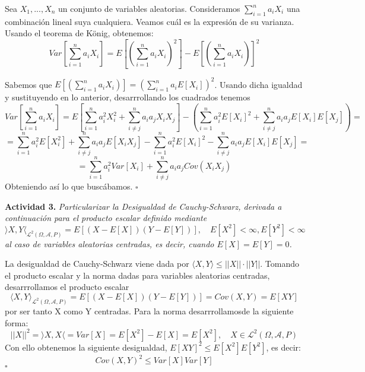 \documentclass[a4paper, 12pt]{article}
\newcommand*{\qed}{\hfill\ensuremath{\square}}
\begin{document}
    Sea $X_1, . . . , X_n$ un conjunto de variables aleatorias. Consideramos $\sum _{i=1}^n a_i X_i$ una combinación lineal suya cualquiera.
    Veamos cuál es la expresión de su varianza. Usando el teorema de König, obtenemos:
    $$Var\left[\sum  _{i=1}^n a_i X_i \right]=E\left[\left(\sum  _{i=1}^n a_i X_i \right)^2\right]-E\left[\left(\sum  _{i=1}^n a_i X_i \right)\right]^2$$
   
    Sabemos que $E\left[\left(\sum  _{i=1}^n a_i X_i \right)\right]=\left(\sum _{i=1}^n a_i E[X_i]\right)^2$. Usando dicha igualdad y sustituyendo
    en lo anterior, desarrrollando los cuadrados tenemos
    $$Var\left[\sum  _{i=1}^n a_i X_i \right]=E\left[\sum  _{i=1}^n a_i^2 X_i^2 + \sum  _{i\neq j}^n a_i a_j X_i X_j\right]-
    \left(\sum  _{i=1}^n a_i^2 E[X_i]^2 + \sum  _{i \neq j}^n a_i a_j E[X_i] E[X_j]\right) = $$
    $$= \sum  _{i=1}^n a_i^2 E[X_i^2] + \sum  _{i \neq j}^n a_i a_j E[X_i X_j] - \sum  _{i=1}^n a_i^2 E[X_i]^2 - \sum  _{i \neq j}^n a_i a_j E[X_i] E[X_j] = $$
    $$= \sum  _{i=1}^n a_i^2 Var[X_i] + \sum  _{i \neq j}^n a_i a_j Cov(X_i X_j)$$
    Obteniendo así lo que buscábamos.
    \qed
    \newpage

    {\bf{Actividad 3.}}{\textit{ Particularizar la Desigualdad de Cauchy-Schwarz, derivada a continuación para el producto escalar definido mediante
    $$\rangle X, Y \langle _ {\mathcal{L}^2 (\Omega, \mathcal{A}, P)} = E[(X-E[X])(Y-E[Y])], \quad E[X^2]<\infty, E[Y^2]<\infty$$
    al caso de variables aleatorias centradas, es decir, cuando $E[X]=E[Y]=0$.}}

    La desigualdad de Cauchy-Schwarz viene dada por $\langle X, Y\rangle \leq ||X|| \cdot ||Y||$. Tomando el producto escalar y la norma dadas para
    variables aleatorias centradas, desarrrollamos el producto escalar
    $$\langle X, Y \rangle _ {\mathcal{L}^2 (\Omega, \mathcal{A}, P)}=E[(X-E[X])(Y-E[Y])] = Cov(X,Y)= E[XY]$$
    por ser tanto X como Y centradas. Para la norma desarrrollamosde la siguiente forma:
    $$||X||^2= \rangle X, X \langle = Var[X]= E[X^2]-E[X]=E[X^2], \quad X \in \mathcal{L}^2 (\Omega, \mathcal{A}, P)$$
    Con ello obtenemos la siguiente desigualdad, $ E[XY]^2 \leq E[X^2]E[Y^2]$, es decir:
    $$Cov(X,Y)^2 \leq Var[X]Var[Y]$$
    \qed
    \newpage
\end{document}
